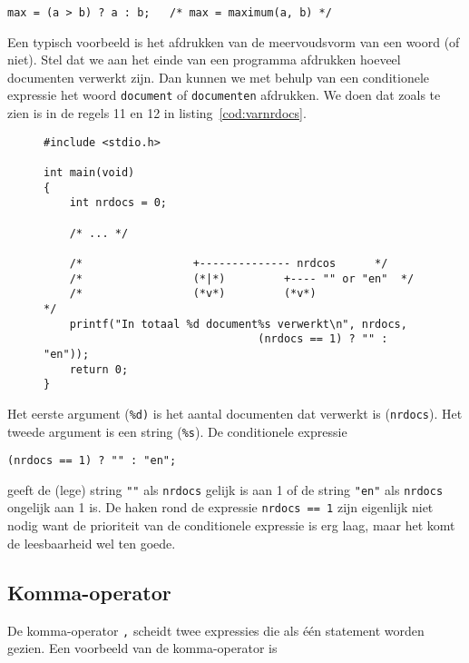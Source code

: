 \hspace*{1em}\texttt{max = (a > b) ? a : b; \ \ /* max = maximum(a, b) */}

Een typisch voorbeeld is het afdrukken van de meervoudsvorm van een woord (of niet). Stel dat we aan het einde van een programma afdrukken hoeveel documenten verwerkt zijn. Dan kunnen we met behulp van een conditionele expressie het woord \texttt{document} of \texttt{documenten} afdrukken. We doen dat zoals te zien is in de regels 11 en 12 in listing~\ref{cod:varnrdocs}.

\begin{figure}[!ht]
\begin{lstlisting}[caption=Het afdrukken van een meervoudsvorm.,label=cod:varnrdocs]
#include <stdio.h>

int main(void)
{
    int nrdocs = 0;

    /* ... */
    
    /*                 +-------------- nrdcos      */
    /*                 (*|*)         +---- "" or "en"  */
    /*                 (*v*)         (*v*)                 */
    printf("In totaal %d document%s verwerkt\n", nrdocs,
                                 (nrdocs == 1) ? "" : "en"));
    return 0;
}
\end{lstlisting}
\end{figure} 

Het eerste argument (\texttt{\%d)} is het aantal documenten dat verwerkt is (\texttt{nrdocs}). Het tweede argument is een string (\texttt{\%s}). De conditionele expressie

\begin{lstlisting}[style=lstoneline]
(nrdocs == 1) ? "" : "en";
\end{lstlisting}

geeft de (lege) string \lstinline[basicstyle=\ttfamily]|""| als \texttt{nrdocs} gelijk is aan 1 of de string \lstinline[basicstyle=\ttfamily]|"en"| als \texttt{nrdocs} ongelijk aan 1 is. De haken rond de expressie \texttt{nrdocs == 1} zijn eigenlijk niet nodig want de prioriteit van de conditionele expressie is erg laag, maar het komt de leesbaarheid wel ten goede.

\subsection{Komma-operator}
De komma-operator\indexop{,} \texttt{,} scheidt twee expressies die als één statement worden gezien. Een voorbeeld van de komma-operator is

